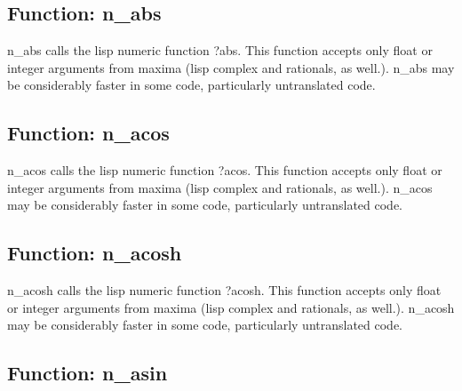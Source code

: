\documentclass[]{article}
\begin{document}
\subsection{Function: n\_abs\label{sec:n_abs}}
\hypertarget{n_abs}{}



\vspace{5 pt}
n\_abs calls the lisp numeric function ?abs. This function accepts only float or integer arguments from maxima (lisp complex and rationals, as well.). n\_abs may be considerably faster in some code, particularly untranslated code. 

\vspace{5 pt}


\subsection{Function: n\_acos\label{sec:n_acos}}
\hypertarget{n_acos}{}



\vspace{5 pt}
n\_acos calls the lisp numeric function ?acos. This function accepts only float or integer arguments from maxima (lisp complex and rationals, as well.). n\_acos may be considerably faster in some code, particularly untranslated code. 

\vspace{5 pt}


\subsection{Function: n\_acosh\label{sec:n_acosh}}
\hypertarget{n_acosh}{}



\vspace{5 pt}
n\_acosh calls the lisp numeric function ?acosh. This function accepts only float or integer arguments from maxima (lisp complex and rationals, as well.). n\_acosh may be considerably faster in some code, particularly untranslated code. 

\vspace{5 pt}


\subsection{Function: n\_asin\label{sec:n_asin}}
\hypertarget{n_asin}{}
\end{document}
